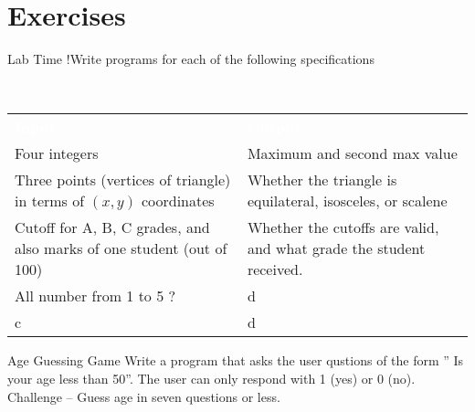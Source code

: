 \section{Exercises}

\begin{frame}[fragile]{Lab Time !}{Write programs for each of the following specifications}
    \begin{block}{~\vspace{0.5cm}}
    \begin{center}
    \vspace{-0.6cm}
    \begin{tabular}{p{}|p{}}
        \textcolor{white}{\bf Input} & \textcolor{white}{\bf Output} \\
        Four integers &
        Maximum and second max value \\ \hline
        Three points (vertices of triangle) in terms of $(x,y)$ coordinates &
        Whether the triangle is equilateral, isosceles, or scalene \\ \hline
        Cutoff for A, B, C grades, and also marks of one student (out of 100) &
        Whether the cutoffs are valid, and what grade the student received. \\ \hline
        All number from 1 to 5 ?  &
        d \\ \hline
        c &
        d
    \end{tabular}
    \end{center}
    \end{block}
    \begin{block}{Age Guessing Game}
        Write a program that asks the user qustions of the form
        '' Is your age less than 50''.
        The user can only respond with 1 (yes) or 0 (no).\\
        Challenge -- Guess age in seven questions or less.
    \end{block}
\end{frame}
